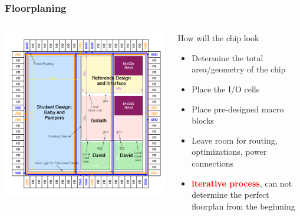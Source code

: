 \documentclass[compress]{beamer}
\begin{document}
\begin{frame}
	\frametitle{Floorplaning}
		\begin{columns}	
		\begin{center}
			\includegraphics[width=\textwidth]{FChip}
		\end{center}
		
		\begin{block}{How will the chip look}
			\begin{itemize}
				\item Determine the total area/geometry of the chip
				\item Place the I/O cells
				\item Place pre-designed macro blocks 
				\item Leave room for routing, optimizations, power connections
				\pause
				\item \textcolor{red}{\textbf{iterative process}}, can not determine the perfect floorplan from the beginning
			\end{itemize}
		\end{block}
	\end{columns}
\end{frame}
\end{document}
